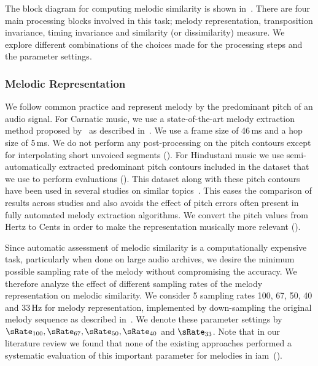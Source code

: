 The block diagram for computing melodic similarity is shown in~. There are four main processing blocks involved in this task; melody representation, transposition invariance, timing invariance and similarity (or dissimilarity) measure. We explore different combinations of the choices made for the processing steps and the parameter settings.

\subsubsection{Melodic Representation}
\label{sec:patterns_melodic_similarity_representation}

We follow common practice and represent melody by the predominant pitch of an audio signal. For Carnatic music, we use a state-of-the-art melody extraction method proposed by~\cite{Salamon2012} as described in~. We use a frame size of 46\,ms and a hop size of 5\,ms. We do not perform any post-processing on the pitch contours except for interpolating short unvoiced segments (). For Hindustani music we use semi-automatically extracted predominant pitch contours included in the dataset that we use to perform evaluations (). This dataset along with these pitch contours have been used in several studies on similar topics~\citep{Rao2014,Ross2012b,Ross2012}. This eases the comparison of results across studies and also avoids the effect of pitch errors often present in fully automated melody extraction algorithms. We convert the pitch values from Hertz to Cents in order to make the representation musically more relevant ().

Since automatic assessment of melodic similarity is a computationally expensive task, particularly when done on large audio archives, we desire the minimum possible sampling rate of the melody without compromising the accuracy. We therefore analyze the effect of different sampling rates of the melody representation on melodic similarity. We consider 5 sampling rates 100, 67, 50, 40 and 33\,Hz for melody representation, implemented by down-sampling the original melody sequence as described in~. We denote these parameter settings by $\sRate_{100}, \sRate_{67}, \sRate_{50}, \sRate_{40}$ and $\sRate_{33}$. Note that in our literature review we found that none of the existing approaches performed a systematic evaluation of this important parameter for melodies in \gls{iam}~().

